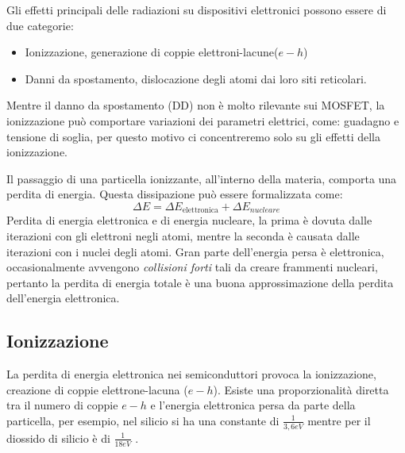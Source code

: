
Gli effetti principali delle radiazioni su dispositivi elettronici possono essere di due categorie\cite{bib:Effetti_Radiazioni_1987}:
\begin{itemize}
	\item Ionizzazione, generazione di coppie elettroni-lacune($e-h$)
	\item Danni da spostamento, dislocazione degli atomi dai loro siti reticolari.
\end{itemize}
Mentre il danno da spostamento (DD) non è molto rilevante sui MOSFET, la ionizzazione può comportare variazioni dei parametri elettrici, come: guadagno e tensione di soglia, per questo motivo ci concentreremo solo su gli effetti della ionizzazione.

\vspace{0.5cm}

Il passaggio di una particella ionizzante, all'interno della materia, comporta una perdita di energia. Questa dissipazione può essere formalizzata come:
$$ \Delta E = \Delta E_{\text{elettronica}} + \Delta E_{nucleare} $$
Perdita di energia elettronica e di energia nucleare, la prima è dovuta dalle iterazioni con gli elettroni negli atomi, mentre la seconda è causata dalle iterazioni con i nuclei degli atomi.
Gran parte dell'energia persa è elettronica, occasionalmente avvengono \textit{collisioni forti} tali da creare frammenti nucleari, pertanto la perdita di energia totale è una buona approssimazione della perdita dell'energia elettronica\cite{bib:Effetti_Radiazioni_NASA}.

\vspace{0.5cm}

\subsection{Ionizzazione}\label{cap1:ionizzazione}
La perdita di energia elettronica nei semiconduttori provoca la ionizzazione, creazione di coppie elettrone-lacuna ($e-h$). Esiste una proporzionalità diretta tra il numero di coppie $e-h$ e l'energia elettronica persa da parte della particella, per esempio, nel silicio si ha una constante di $\frac{1}{3,6eV}$ mentre per il diossido di silicio è di $\frac{1}{18eV}$ \cite{bib:Effetti_Radiazioni_NASA}.

\vspace{0.5cm}

